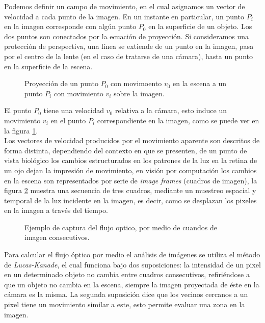 \documentclass{iccmemoria}
\begin{document}
Podemos definir un campo de movimiento, en el cual asignamos un vector de velocidad a cada punto de la imagen. En un instante en particular, un punto $P_i$ en la imagen corresponde con algún punto $P_0$ en la superficie de un objeto. Los dos puntos son conectados por la ecuación de proyección. Si consideramos una protección de perspectiva, una línea se extiende de un punto en la imagen, pasa por el centro de la lente (en el caso de tratarse de una cámara), hasta un punto en la superficie de la escena.\\


\begin{figure}[H]
  \centering
  
  \caption{Proyección de un punto $P_0$ con movimoento $v_0$ en la escena  a un punto $P_i$ con movimiento $v_i$ sobre la imagen.}
  \label{fig:proyeccion_flujo_optico}
\end{figure}

El punto $P_{0}$ tiene una velocidad $v_{0}$ relativa a la cámara, esto induce un movimiento $v_{i}$ en el punto $P_{i}$ correspondiente en la imagen, como se puede ver en la figura \ref{fig:proyeccion_flujo_optico}\cite{horn1986robot}.\\

Los vectores de velocidad producidos por el movimiento aparente son descritos de forma distinta, dependiendo del contexto en que se presenten, de un punto de vista biológico los cambios estructurados en los patrones de la luz en la retina de un ojo dejan la impresión de movimiento, en visión por computación los cambios en la escena son representados por serie de \emph{image frames} (cuadros de imagen), la figura \ref{fig:ejemplo_flujo_optico} muestra una secuencia de tres cuadros, mediante un muestreo espacial y temporal de la luz incidente en la imagen, es decir, como se desplazan los pixeles en la imagen a través del tiempo.\\

\begin{figure}[H]
  \centering
  
  \caption{Ejemplo de captura del flujo optico, por medio de cuandos de imagen consecutivos.}
  \label{fig:ejemplo_flujo_optico}
\end{figure}

Para calcular el flujo óptico por medio el análisis de imágenes se utiliza el método de \emph{Lucas-Kanade}, el cual funciona bajo dos suposiciones: la intensidad de un pixel en un determinado objeto no cambia entre cuadros consecutivos, refiriéndose a que un objeto no cambia en la escena, siempre la imagen proyectada de éste en la cámara es la misma. La segunda suposición dice que los vecinos cercanos a un pixel tiene un movimiento similar a este, esto permite evaluar una zona en la imagen.\\
\end{document}
